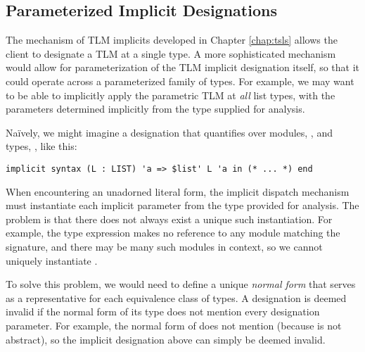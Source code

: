 

\subsection{Parameterized Implicit Designations}\label{sec:parametric-designations}
The mechanism of TLM implicits developed in Chapter \ref{chap:tsls} allows the client to designate a TLM at a single type. A more sophisticated mechanism would allow for parameterization of the TLM implicit designation itself, so that it could operate across a parameterized family of types. For example, we may want to be able to implicitly apply the parametric TLM  at \emph{all} list types, with the parameters determined implicitly from the type supplied for analysis.

Na\"ively, we might imagine a designation that quantifies over modules, , and types, , like this:
\begin{lstlisting}[numbers=none]
implicit syntax (L : LIST) 'a => $list' L 'a in (* ... *) end 
\end{lstlisting}
When encountering an unadorned literal form, the implicit dispatch mechanism must  instantiate each implicit parameter from the type provided for analysis. The problem is that there does not always exist a unique such instantiation. For example, the type expression  makes no reference to any module matching the  signature, and there may be many such modules in context, so we cannot uniquely instantiate .

To solve this problem, we would need to define a unique \emph{normal form} that serves as a representative for each equivalence class of types. A designation is deemed invalid if the normal form of its type does not mention every designation parameter. For example, the normal form of  does not mention  (because  is not abstract), so the implicit designation above can simply be deemed invalid.

